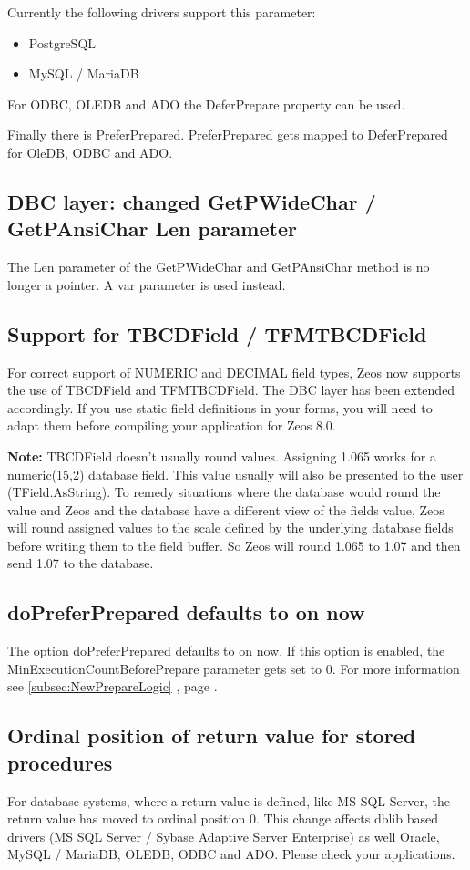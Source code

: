 \documentclass[a4paper,12pt,oneside]{article}
\begin{document}
Currently the following drivers support this parameter:
\begin{itemize}
  	\item PostgreSQL
	\item MySQL / MariaDB
\end{itemize}

For ODBC, OLEDB and ADO the DeferPrepare property can be used.

Finally there is PreferPrepared.
PreferPrepared gets mapped to DeferPrepared for OleDB, ODBC and ADO.

\subsection{DBC layer: changed GetPWideChar / GetPAnsiChar Len parameter}
The Len parameter of the GetPWideChar and GetPAnsiChar method is no longer a pointer.
A var parameter is used instead.

\subsection{Support for TBCDField / TFMTBCDField}
For correct support of NUMERIC and DECIMAL field types, Zeos now supports the use of TBCDField and TFMTBCDField.
The DBC layer has been extended accordingly.
If you use static field definitions in your forms, you will need to adapt them before compiling your application for Zeos 8.0.

\textbf{Note:}
TBCDField doesn't usually round values.
Assigning 1.065 works for a numeric(15,2) database field.
This value usually will also be presented to the user (TField.AsString).
To remedy situations where the database would round the value and Zeos and the database have a different view of the fields value, Zeos will round assigned values to the scale defined by the underlying database fields before writing them to the field buffer.
So Zeos will round 1.065 to 1.07 and then send 1.07 to the database.

\subsection{doPreferPrepared defaults to on now}
The option doPreferPrepared defaults to on now.
If this option is enabled, the MinExecutionCountBeforePrepare parameter gets set to 0.
For more information see \ref{subsec:NewPrepareLogic} , page \pageref{subsec:NewPrepareLogic}.

\subsection{Ordinal position of return value for stored procedures}
For database systems, where a return value is defined, like MS SQL Server, the return value has moved to ordinal position 0.
This change affects dblib based drivers (MS SQL Server / Sybase Adaptive Server Enterprise) as well Oracle, MySQL / MariaDB, OLEDB, ODBC and ADO.
Please check your applications.
\end{document}
